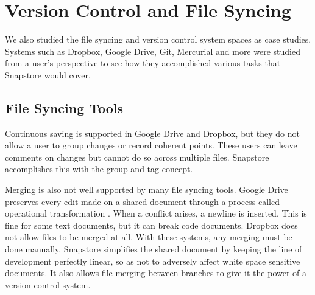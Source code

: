 


\section{Version Control and File Syncing}

We also studied the file syncing and version control system spaces as case studies. Systems such as Dropbox, Google Drive, Git, Mercurial and more were studied from a user's perspective to see how they accomplished various tasks that Snapstore would cover.

\subsection{File Syncing Tools}

Continuous saving is supported in Google Drive and Dropbox, but they do not allow a user to group changes or record coherent points. These users can leave comments on changes but cannot do so across multiple files. Snapstore accomplishes this with the group and tag concept.

Merging is also not well supported by many file syncing tools. Google Drive preserves every edit made on a shared document through a process called operational transformation \cite{Xu}. When a conflict arises, a newline is inserted. This is fine for some text documents, but it can break code documents. Dropbox does not allow files to be merged at all. With these systems, any merging must be done manually. Snapstore simplifies the shared document by keeping the line of development perfectly linear, so as not to adversely affect white space sensitive documents. It also allows file merging between branches to give it the power of a version control system.

